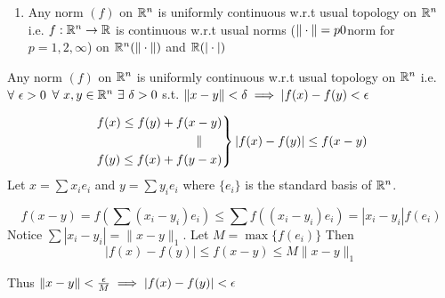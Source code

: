 {\begin{enumerate}
\begin{itemize}
			            Matrix of $T=\begin{bmatrix}
					            a_{11} & a_{12} & \cdots & a_{1n} \\
					            a_{21} & a_{22} & \cdots & a_{2n} \\
					            \vdots & \vdots & \ddots & \vdots \\
					            a_{m1} & a_{m2} & \cdots & a_{mn}
				            \end{bmatrix}$
			      \item  $\underset{A}{M_{n\times n}(\bbR)}\underset{\longmapsto}{\to} \underset{det(A)}{\bbR}$ is continuous

			            $\frac1{\text{det}}:GL_n(\bbR)\to\bbR$ \parinn

			            Here $M_{n\times n}$ is a vector space of dimension $n^2$ in which $GL_n(\bbR)=\{A\mid \det(A)\neq 0\}$ is an open set.

			      \item $\underset{A\longmapsto A^{-1}}{ GL_n(\bbR) \to GL_n(\bbR) }$ is continuous.

		      \end{itemize}
		\item Any norm $(f)$ on $\mathbb{R}^n$ is uniformly continuous w.r.t usual topology on $\mathbb{R}^n$ i.e. $f:\mathbb{R}^n\to\mathbb{R}$ is continuous w.r.t usual norms ($\|\cdot\|=p0$norm for $p=1,2,\infty$) on $\mathbb{R}^n(\|\cdot\|)$ and $\mathbb{R}(|\cdot|)$
	\end{enumerate}
}
\begin{Theorem}{}{}
	Any norm $(f)$ on $\mathbb{R}^n$ is uniformly continuous w.r.t usual topology on $\mathbb{R}^n$ i.e. $\forall\ \epsilon>0$ $\forall\ x,y\in\mathbb{R}^n\ \exists\ \delta>0$ s.t. $\|x-y\|<\delta\implies |f(x)-f(y)<\epsilon$
\end{Theorem}
\begin{myproof}
	$$\begin{rcases*}
			f(x)\leq f(y)+f(x-y) \\ \qquad \qquad\qquad \qquad \parallel\\ f(y)\leq f(x)+f(y-x)
		\end{rcases*}|f(x)-f(y)|\leq f(x-y)$$Let $x=\sum x_ie_i$ and $y=\sum y_ie_i$ where $\{e_i\}$ is the standard basis of $\mathbb{R}^n$.

	$$f(x-y)=f\left(\sum (x_i-y_i)e_i\right)\leq \sum f\left((x_i-y_i)e_i\right)=|x_i-y_i|f(e_i)$$ Notice $\sum|x_i-y_i|=\|x-y\|_1$. Let $M=\max\{f(e_i)\}$ Then $$|f(x)-f(y)|\leq f(x-y)\leq M\|x-y\|_1$$

	Thus $\|x-y\|<\frac{\epsilon}{M}\implies |f(x)-f(y)|<\epsilon$
\end{myproof}
